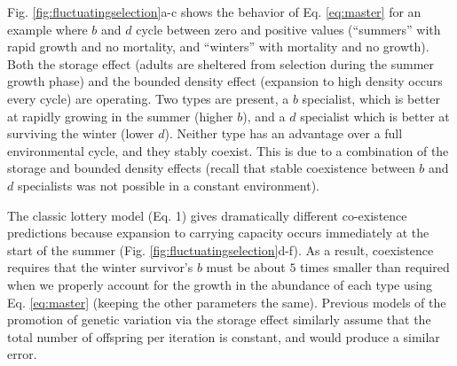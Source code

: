 \documentclass[11pt]{article}
\begin{document}
Fig. \ref{fig:fluctuatingselection}a-c shows the behavior of Eq. \eqref{eq:master} for an example where $b$ and $d$ cycle between zero and positive values (``summers'' with rapid growth and no mortality, and ``winters'' with mortality and no growth). Both the storage effect (adults are sheltered from selection during the summer growth phase) and the bounded density effect (expansion to high density occurs every cycle) are operating. Two types are present, a $b$ specialist, which is better at rapidly growing in the summer (higher $b$), and a $d$ specialist which is better at surviving the winter (lower $d$). Neither type has an advantage over a full environmental cycle, and they stably coexist. This is due to a combination of the storage and bounded density effects (recall that stable coexistence between $b$ and $d$ specialists was not possible in a constant environment). 

The classic lottery model (Eq. 1) gives dramatically different co-existence predictions because expansion to carrying capacity occurs immediately at the start of the summer (Fig. \ref{fig:fluctuatingselection}d-f). As a result, coexistence requires that the winter survivor's $b$ must be about $5$ times smaller than required when we properly account for the growth in the abundance of each type using Eq. \eqref{eq:master} (keeping the other parameters the same). Previous models of the promotion of genetic variation via the storage effect  \citep{ellner_1994} similarly assume that the total number of offspring per iteration is constant, and would produce a similar error. 

\end{document}
